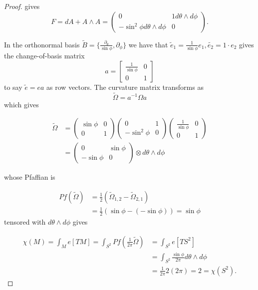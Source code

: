 \documentclass{amsart}
\begin{document}
\begin{proof}
gives $$ F = dA + A \wedge A = \left( \begin{matrix} 0 & 1 d\theta \wedge d\phi \\ -\sin^2\phi d\theta \wedge d\phi & 0 \end{matrix}\right). $$ 

In the orthonormal basis $\tilde{B} = \{ \frac{\partial_\theta}{\sin\phi}, \partial_\phi \}$ we have that $\tilde{e}_1 = \frac{1}{\sin\phi}e_1, \tilde{e_2} = 1\cdot e_2$ gives the change-of-basis matrix $$ a = \left[ \begin{matrix} \frac{1}{\sin\phi} & 0 \\ 0 & 1 \end{matrix}\right]$$ to say $\tilde{e} = ea$ as row vectors. The curvature matrix transforms as $$ \tilde{\Omega} = a^{-1}\Omega a $$ which gives 

\begin{align*} \tilde{\Omega} &= \left( \begin{matrix} \sin\phi & 0 \\ 0 & 1 \end{matrix}\right) \left(\begin{matrix} 0 & 1 \\ -\sin^2\phi & 0 \end{matrix}\right) \left(\begin{matrix} \frac{1}{\sin\phi} & 0 \\ 0 & 1 \end{matrix}\right)  \\
&= \left( \begin{matrix} 0 & \sin\phi\\ -\sin\phi & 0 \end{matrix}\right) \otimes d\theta \wedge d\phi \end{align*}

whose Pfaffian is 

\begin{align*}
Pf(\tilde{\Omega}) &= \frac{1}{2} ( \tilde{\Omega}_{1,2} - \tilde{\Omega}_{2,1} )\\
&= \frac{1}{2} ( \sin\phi - (-\sin\phi) ) = \sin\phi \end{align*} tensored with $d\theta \wedge d\phi$ gives

\begin{align*}
\chi(M) = \int_{M} e[TM]= \int_{S^2} Pf(\frac{1}{2\pi} \tilde{\Omega}) &= \int_{S^2} e[TS^2] \\
&= \int_{S^2} \frac{\sin\phi}{2\pi}d\theta \wedge d\phi\\
&= \frac{1}{2\pi} 2(2\pi) = 2 = \chi(S^2). \end{align*}


    
\end{proof}
\end{document}
